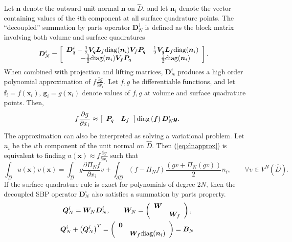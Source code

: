 \documentclass[review]{siamart0216}
\theoremstyle{assumption}
\renewcommand{\hat}[1]{\widehat{#1}}
\newcommand{\pd}[2]{\frac{\partial#1}{\partial#2}}
\newcommand{\LRp}[1]{\left( #1 \right)}
\newcommand{\LRs}[1]{\left[ #1 \right]}
\begin{document}
Let $\bm{n}$ denote the outward unit normal $\bm{n}$ on $\hat{D}$, and let $\bm{n}_i$ denote the vector containing values of the $i$th component at all surface quadrature points.  The ``decoupled'' summation by parts operator $\bm{D}^i_N$ is defined as the block matrix involving both volume and surface quadratures
\begin{align}
\bm{D}^i_N  &= \LRs{
\begin{array}{cc}
\bm{D}^i_q - \frac{1}{2}\bm{V}_q \bm{L}_f {\rm diag}({\bm{n}}_i) \bm{V}_f\bm{P}_q &  \frac{1}{2}\bm{V}_q\bm{L}_f{\rm diag}({\bm{n}}_i)\\
-\frac{1}{2}{\rm diag}({\bm{n}}_i)\bm{V}_f\bm{P}_q & \frac{1}{2}{\rm diag}({\bm{n}}_i)
\end{array}}.  
\label{eq:DN}
\end{align}
When combined with projection and lifting matrices, $\bm{D}^i_N$ produces a high order polynomial approximation of $f\pd{g}{x_i}$. 
Let $f, g$ be differentiable functions, and let $\bm{f}_i = f(\bm{x}_i)$, $\bm{g}_i = g(\bm{x}_i)$ denote values of $f,g$ at volume and surface quadrature points.  Then,
\begin{gather}
f\pd{g}{x_i} \approx \LRs{\begin{array}{cc}
\bm{P}_q & \bm{L}_f\end{array}} {\rm diag}\LRp{\bm{f}}\bm{D}^i_N \bm{g}.  
\label{eq:dnapprox}
\end{gather}
The approximation can also be interpreted as solving a variational problem.  Let $n_i$ be the $i$th component of the unit normal on $\hat{D}$.  Then (\ref{eq:dnapprox}) is equivalent to finding $u(\bm{x}) \approx f\pd{g}{x_i}$ such that 
\[
\int_{\hat{D}} u(\bm{x})v(\bm{x})  = \int_{\hat{D}}{g\pd{\Pi_Nf}{x_i}v} + \int_{\partial \hat{D}}{(f-\Pi_Nf)\frac{\LRp{gv + \Pi_N(gv)}}{2}}n_i, \qquad \forall v\in V^N\LRp{\hat{D}}.
\]
If the surface quadrature rule is exact for polynomials of degree $2N$, then the decoupled SBP operator $\bm{D}^i_N$ also satisfies a summation by parts property.  
\begin{gather}
\bm{Q}^i_N = \bm{W}_N \bm{D}^i_N, \qquad \bm{W}_N = \LRp{\begin{array}{cc}\bm{W}&\\ & \bm{W}_f\end{array}},\label{eq:dsbp}\\ \bm{Q}^i_N+\LRp{\bm{Q}^i_N}^T = \LRp{\begin{array}{cc}\bm{0}&\\ & \bm{W}_f {\rm diag}(\bm{n}_i)\end{array}} = \bm{B}_N\nonumber
\end{gather}
\end{document}
